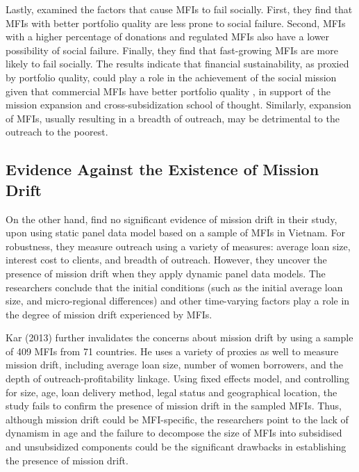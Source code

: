 \documentclass[a4paper, nobind]{templates/ociamthesis}
\begin{document}
Lastly, \textcite{dorfleitner2017microfinance} examined the factors that cause MFIs to fail socially. First, they find that MFIs with better portfolio quality are less prone to social failure. Second, MFIs with a higher percentage of donations and regulated MFIs also have a lower possibility of social failure. Finally, they find that fast-growing MFIs are more likely to fail socially. The results indicate that financial sustainability, as proxied by portfolio quality, could play a role in the achievement of the social mission given that commercial MFIs have better portfolio quality \autocite{tchakoute2010there}, in support of the mission expansion and cross-subsidization school of thought. Similarly, expansion of MFIs, usually resulting in a breadth of outreach, may be detrimental to the outreach to the poorest.

\hypertarget{evidence-against-the-existence-of-mission-drift}{%
\subsection{Evidence Against the Existence of Mission Drift}\label{evidence-against-the-existence-of-mission-drift}}

\noindent On the other hand, \textcite{abeysekera2014sustainability} find no significant evidence of mission drift in their study, upon using static panel data model based on a sample of MFIs in Vietnam. For robustness, they measure outreach using a variety of measures: average loan size, interest cost to clients, and breadth of outreach. However, they uncover the presence of mission drift when they apply dynamic panel data models. The researchers conclude that the initial conditions (such as the initial average loan size, and micro-regional differences) and other time-varying factors play a role in the degree of mission drift experienced by MFIs.

Kar (2013) further invalidates the concerns about mission drift by using a sample of 409 MFIs from 71 countries. He uses a variety of proxies as well to measure mission drift, including average loan size, number of women borrowers, and the depth of outreach-profitability linkage. Using fixed effects model, and controlling for size, age, loan delivery method, legal status and geographical location, the study fails to confirm the presence of mission drift in the sampled MFIs. Thus, although mission drift could be MFI-specific, the researchers point to the lack of dynamism in age and the failure to decompose the size of MFIs into subsidised and unsubsidized components could be the significant drawbacks in establishing the presence of mission drift.
\end{document}
